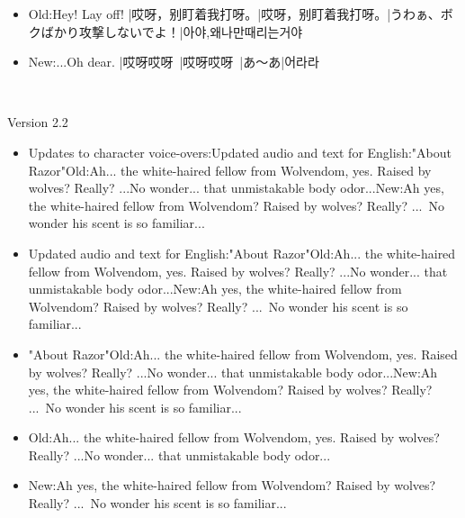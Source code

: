 \documentclass[a4paper,12pt]{article}
\begin{document}
\begin{itemize}
\item Old:Hey! Lay off! |哎呀，别盯着我打呀。|哎呀，别盯着我打呀。|うわぁ、ボクばかり攻撃しないでよ！|아야,왜나만때리는거야
\item New:...Oh dear. |哎呀哎呀~|哎呀哎呀~|あ～あ|어라라~
\end{itemize}\\ \par \vspace{0.5cm}

Version 2.2\\ \par \vspace{0.5cm}

\begin{itemize}
\item Updates to character voice-overs:Updated audio and text for English:"About Razor"Old:Ah... the white-haired fellow from Wolvendom, yes. Raised by wolves? Really? ...No wonder... that unmistakable body odor...New:Ah yes, the white-haired fellow from Wolvendom? Raised by wolves? Really? ... No wonder his scent is so familiar...
\item Updated audio and text for English:"About Razor"Old:Ah... the white-haired fellow from Wolvendom, yes. Raised by wolves? Really? ...No wonder... that unmistakable body odor...New:Ah yes, the white-haired fellow from Wolvendom? Raised by wolves? Really? ... No wonder his scent is so familiar...
\item "About Razor"Old:Ah... the white-haired fellow from Wolvendom, yes. Raised by wolves? Really? ...No wonder... that unmistakable body odor...New:Ah yes, the white-haired fellow from Wolvendom? Raised by wolves? Really? ... No wonder his scent is so familiar...
\item Old:Ah... the white-haired fellow from Wolvendom, yes. Raised by wolves? Really? ...No wonder... that unmistakable body odor...
\item New:Ah yes, the white-haired fellow from Wolvendom? Raised by wolves? Really? ... No wonder his scent is so familiar...
\end{itemize}\\ \par \vspace{0.5cm}
\end{document}
